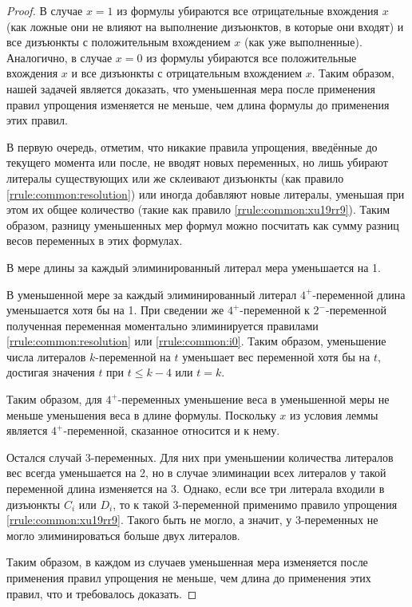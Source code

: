 \begin{proof}
 В случае $x = 1$ из формулы убираются все отрицательные вхождения $x$ (как ложные они не влияют на выполнение дизъюнктов, в которые они входят) и все дизъюнкты с положительным вхождением $x$ (как уже выполненные). Аналогично, в случае $x = 0$ из формулы убираются все положительные вхождения $x$ и все дизъюнкты с отрицательным вхождением $x$. Таким образом, нашей задачей является доказать, что уменьшенная мера после применения правил упрощения изменяется не меньше, чем длина формулы до применения этих правил.

 В первую очередь, отметим, что никакие правила упрощения, введённые до текущего момента или после, не вводят новых переменных, но лишь убирают литералы существующих или же склеивают дизъюнкты (как правило \ref{rrule:common:resolution}) или иногда добавляют новые литералы, уменьшая при этом их общее количество (такие как правило \ref{rrule:common:xu19rr9}). Таким образом, разницу уменьшенных мер формул можно посчитать как сумму разниц весов переменных в этих формулах.

 В мере длины за каждый элиминированный литерал мера уменьшается на 1.

 В уменьшенной мере за каждый элиминированный литерал $4^+$-переменной длина уменьшается хотя бы на 1. При сведении же $4^+$-переменной к $2^-$-переменной полученная переменная моментально элиминируется правилами \ref{rrule:common:resolution} или \ref{rrule:common:i0}. Таким образом, уменьшение числа литералов $k$-переменной на $t$ уменьшает вес переменной хотя бы на $t$, достигая значения $t$ при $t \leq k - 4$ или $t = k$.

 Таким образом, для $4^+$-переменных уменьшение веса в уменьшенной меры не меньше уменьшения веса в длине формулы. Поскольку $x$ из условия леммы является $4^+$-переменной, сказанное относится и к нему.

 Остался случай 3-переменных. Для них при уменьшении количества литералов вес всегда уменьшается на 2, но в случае элиминации всех литералов у такой переменной длина изменяется на 3. Однако, если все три литерала входили в дизъюнкты $C_i$ или $D_i$, то к такой 3-переменной применимо правило упрощения \ref{rrule:common:xu19rr9}. Такого быть не могло, а значит, у 3-переменных не могло элиминироваться больше двух литералов.

 Таким образом, в каждом из случаев уменьшенная мера изменяется после применения правил упрощения не меньше, чем длина до применения этих правил, что и требовалось доказать.
\end{proof}

